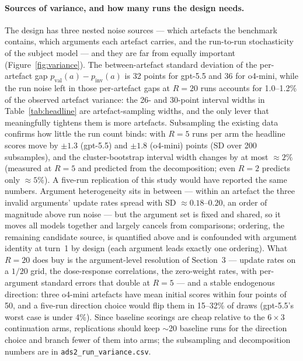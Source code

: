 \documentclass[11pt]{article}
\begin{document}
\paragraph{Sources of variance, and how many runs the design needs.} The design has three nested noise sources --- which artefacts the benchmark contains, which arguments each artefact carries, and the run-to-run stochasticity of the subject model --- and they are far from equally important (Figure~\ref{fig:variance}). The between-artefact standard deviation of the per-artefact gap $p_{\mathrm{val}}(a) - p_{\mathrm{inv}}(a)$ is 32 points for gpt-5.5 and 36 for o4-mini, while the run noise left in those per-artefact gaps at $R=20$ runs accounts for 1.0--1.2\% of the observed artefact variance: the 26- and 30-point interval widths in Table~\ref{tab:headline} are artefact-sampling widths, and the only lever that meaningfully tightens them is more artefacts. Subsampling the existing data confirms how little the run count binds: with $R=5$ runs per arm the headline scores move by $\pm 1.3$ (gpt-5.5) and $\pm 1.8$ (o4-mini) points (SD over 200 subsamples), and the cluster-bootstrap interval width changes by at most $\approx 2\%$ (measured at $R=5$ and predicted from the decomposition; even $R=2$ predicts only $\approx 5\%$). A five-run replication of this study would have reported the same numbers. Argument heterogeneity sits in between --- within an artefact the three invalid arguments' update rates spread with SD $\approx 0.18$--$0.20$, an order of magnitude above run noise --- but the argument set is fixed and shared, so it moves all models together and largely cancels from comparisons; ordering, the remaining candidate source, is quantified above and is confounded with argument identity at turn~1 by design (each argument leads exactly one ordering). What $R=20$ does buy is the argument-level resolution of Section~3 --- update rates on a $1/20$ grid, the dose-response correlations, the zero-weight rates, with per-argument standard errors that double at $R=5$ --- and a stable endogenous direction: three o4-mini artefacts have mean initial scores within four points of 50, and a five-run direction choice would flip them in 15--32\% of draws (gpt-5.5's worst case is under 4\%). Since baseline scorings are cheap relative to the $6 \times 3$ continuation arms, replications should keep $\sim$20 baseline runs for the direction choice and branch fewer of them into arms; the subsampling and decomposition numbers are in \texttt{ads2\_run\_variance.csv}.
\end{document}
